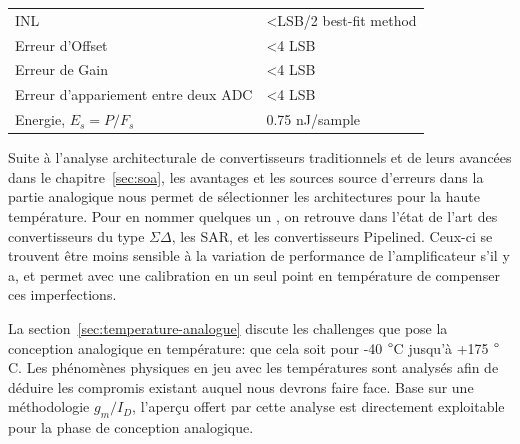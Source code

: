 \begin{mdframed}[linecolor=Prune,linewidth=1]
\begin{center}
\begin{tabular}{ll}
    INL                              & \textless LSB/2 best-fit method                                                                                                                             \\
    Erreur d'Offset                     & \textless 4 LSB                                                                                                                                             \\
    Erreur de Gain                       & \textless 4 LSB                                                                                                                                             \\
    Erreur d'appariement entre deux ADC      & \textless 4 LSB                                                                                                                                             \\
    Energie, $E_s = P/F_s$            & 0.75 nJ/sample      \\ \bottomrule                                                                                                                                       
    \end{tabular}
\end{center}

Suite à l’analyse architecturale de convertisseurs traditionnels et de leurs avancées dans le chapitre~\ref{sec:soa}, les avantages et les sources source d’erreurs dans la partie analogique nous permet de sélectionner les architectures pour la haute température. Pour en nommer quelques un , on retrouve dans l’état de l’art des convertisseurs du type \(\Sigma \Delta\), les SAR, et les convertisseurs Pipelined. Ceux-ci se trouvent être moins sensible à la variation de performance de l’amplificateur s'il y a, et permet avec une calibration en un seul point en température de compenser ces imperfections.

La section~\ref{sec:temperature-analogue} discute les challenges que pose la conception analogique en température: que cela soit pour -40 \(\degree\)C jusqu’à +175 \(\degree\)C. Les phénomènes physiques en jeu avec les températures sont analysés afin de déduire les compromis existant auquel nous devrons faire face.  Base sur une méthodologie \(g_m/I_D\), l’aperçu offert par cette analyse est directement exploitable pour la phase de conception analogique.

\begin{center}
    \centering
    
    \label{fig:tradeoffs-fr}
\end{center}


\end{mdframed}
